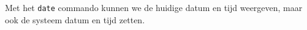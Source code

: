 Met het \texttt{date} commando kunnen we de huidige datum en tijd weergeven, maar ook de systeem datum en tijd zetten.


